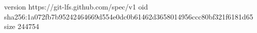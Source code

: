 version https://git-lfs.github.com/spec/v1
oid sha256:1a072fb7b95242464669d554e0dc0b61462d3658014956ccc80bf321f6181d65
size 244754
